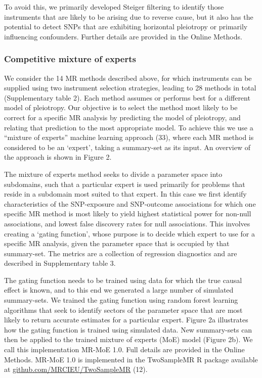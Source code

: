 \documentclass[]{article}
\begin{document}
To avoid this, we primarily developed Steiger filtering to identify
those instruments that are likely to be arising due to reverse cause,
but it also has the potential to detect SNPs that are exhibiting
horizontal pleiotropy or primarily influencing confounders. Further
details are provided in the Online Methods.

\subsubsection{Competitive mixture of
experts}\label{competitive-mixture-of-experts}

We consider the 14 MR methods described above, for which instruments can
be supplied using two instrument selection strategies, leading to 28
methods in total (Supplementary table 2). Each method assumes or
performs best for a different model of pleiotropy. Our objective is to
select the method most likely to be correct for a specific MR analysis
by predicting the model of pleiotropy, and relating that prediction to
the most appropriate model. To achieve this we use a ``mixture of
experts'' machine learning approach (33), where each MR method is
considered to be an `expert', taking a summary-set as its input. An
overview of the approach is shown in Figure 2.

The mixture of experts method seeks to divide a parameter space into
subdomains, such that a particular expert is used primarily for problems
that reside in a subdomain most suited to that expert. In this case we
first identify characteristics of the SNP-exposure and SNP-outcome
associations for which one specific MR method is most likely to yield
highest statistical power for non-null associations, and lowest false
discovery rates for null associations. This involves creating a `gating
function', whose purpose is to decide which expert to use for a specific
MR analysis, given the parameter space that is occupied by that
summary-set. The metrics are a collection of regression diagnostics and
are described in Supplementary table 3.

The gating function needs to be trained using data for which the true
causal effect is known, and to this end we generated a large number of
simulated summary-sets. We trained the gating function using random
forest learning algorithms that seek to identify sectors of the
parameter space that are most likely to return accurate estimates for a
particular expert. Figure 2a illustrates how the gating function is
trained using simulated data. New summary-sets can then be applied to
the trained mixture of experts (MoE) model (Figure 2b). We call this
implementation MR-MoE 1.0. Full details are provided in the Online
Methods. MR-MoE 1.0 is implemented in the TwoSampleMR R package
available at
\href{https://github.com/MRCIEU/TwoSampleMR}{github.com/MRCIEU/TwoSampleMR}
(12).
\end{document}
